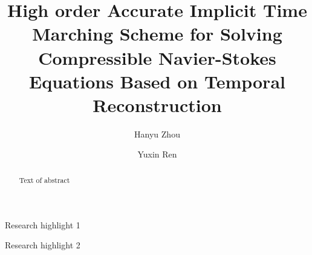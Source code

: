 \documentclass[preprint,12pt]{elsarticle}
\begin{document}
\begin{frontmatter}


    \title{High order Accurate Implicit Time Marching Scheme for
        Solving Compressible Navier-Stokes Equations Based on Temporal
        Reconstruction}




    \author[THUDEM]{Hanyu Zhou}
    \author[THUDEM]{Yuxin Ren}




    \begin{abstract}
        Text of abstract

    \end{abstract}


    \begin{highlights}
        \item Research highlight 1
        \item Research highlight 2
    \end{highlights}


\end{frontmatter}
\end{document}
